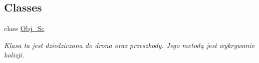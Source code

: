 \subsection*{Classes}
\begin{DoxyCompactItemize}
\item 
class \hyperlink{class_obj___sc}{Obj\+\_\+\+Sc}
\begin{DoxyCompactList}\small\item\em Klasa ta jest dziedziczona do drona oraz przeszkody. Jego metodą jest wykrywanie kolizji. \end{DoxyCompactList}\end{DoxyCompactItemize}
